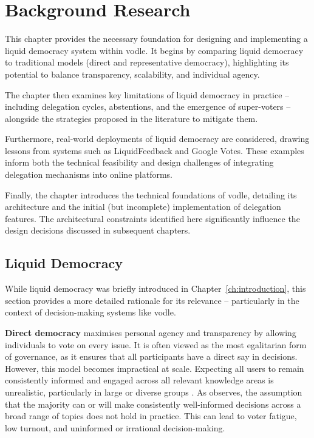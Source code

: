 \chapter{Background Research}\label{ch:background}
This chapter provides the necessary foundation for designing and implementing a liquid democracy system within vodle. It begins by comparing liquid democracy to traditional models (direct and representative democracy), highlighting its potential to balance transparency, scalability, and individual agency.

The chapter then examines key limitations of liquid democracy in practice -- including delegation cycles, abstentions, and the emergence of super-voters -- alongside the strategies proposed in the literature to mitigate them.

Furthermore, real-world deployments of liquid democracy are considered, drawing lessons from systems such as LiquidFeedback and Google Votes. These examples inform both the technical feasibility and design challenges of integrating delegation mechanisms into online platforms.

Finally, the chapter introduces the technical foundations of vodle, detailing its architecture and the initial (but incomplete) implementation of delegation features. The architectural constraints identified here significantly influence the design decisions discussed in subsequent chapters.
\section{Liquid Democracy}

While liquid democracy was briefly introduced in Chapter~\ref{ch:introduction}, this section provides a more detailed rationale for its relevance -- particularly in the context of decision-making systems like vodle.

\textbf{Direct democracy} maximises personal agency and transparency by allowing individuals to vote on every issue. It is often viewed as the most egalitarian form of governance, as it ensures that all participants have a direct say in decisions. However, this model becomes impractical at scale. Expecting all users to remain consistently informed and engaged across all relevant knowledge areas is unrealistic, particularly in large or diverse groups \citep{ford_delegative_2002}. As \citet{ford_delegative_2002} observes, the assumption that the majority can or will make consistently well-informed decisions across a broad range of topics does not hold in practice. This can lead to voter fatigue, low turnout, and uninformed or irrational decision-making.

